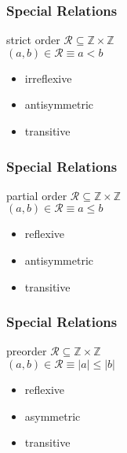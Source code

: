 \documentclass[dvipsnames]{beamer}
\begin{document}
\begin{frame}
  \frametitle{Special Relations}

  \begin{block}{strict order}
    $\mathcal{R} \subseteq \mathbb{Z} \times \mathbb{Z}$\\
    $(a,b) \in \mathcal{R} \equiv a<b$

    \medskip
    \begin{itemize}
      \item irreflexive
      \item antisymmetric
      \item transitive
    \end{itemize}
  \end{block}
\end{frame}

\begin{frame}
  \frametitle{Special Relations}

  \begin{block}{partial order}
    $\mathcal{R} \subseteq \mathbb{Z} \times \mathbb{Z}$\\
    $(a,b) \in \mathcal{R} \equiv a \leq b$

    \medskip
    \begin{itemize}
      \item reflexive
      \item antisymmetric
      \item transitive
    \end{itemize}
  \end{block}
\end{frame}

\begin{frame}
  \frametitle{Special Relations}

  \begin{block}{preorder}
    $\mathcal{R} \subseteq \mathbb{Z} \times \mathbb{Z}$\\
    $(a,b) \in \mathcal{R} \equiv |a| \leq |b|$

    \medskip
    \begin{itemize}
      \item reflexive
      \item asymmetric
      \item transitive
    \end{itemize}
  \end{block}
\end{frame}
\end{document}
